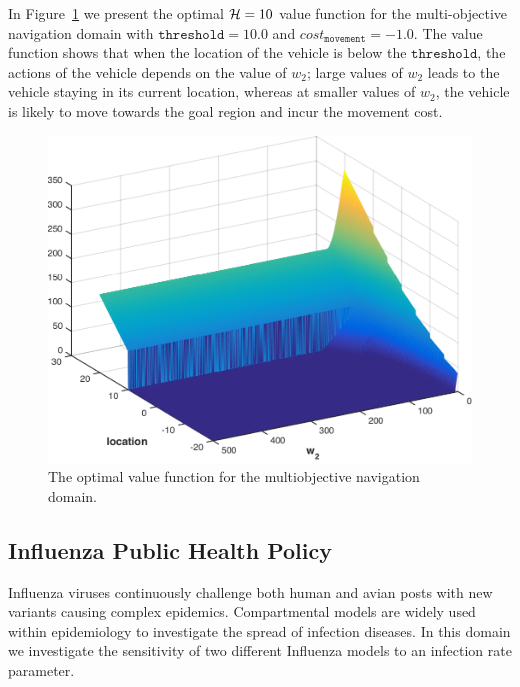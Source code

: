 In Figure~\ref{fig:vehicle1d} we present the optimal {\footnotesize$ \mathcal{H} = 10 $} value function for the multi-objective navigation domain with {\footnotesize $ \mathtt{threshold} = 10.0 $} and {\footnotesize$ cost_{\mathtt{movement}} = -1.0 $}. The value function shows that when the location of the vehicle is below the {\footnotesize $ \mathtt{threshold} $}, the actions of the vehicle depends on the value of {\footnotesize $ w_2 $}; large values of {\footnotesize $ w_2 $} leads to the vehicle staying in its current location, whereas at smaller values of {\footnotesize $ w_2 $}, the vehicle is likely to move towards the goal region and incur the movement cost.
\begin{figure}[h!]
    \centering
    \includegraphics[width=0.8\linewidth, height=0.6\linewidth]{images/robot1d}
    \caption{The optimal value function for the multiobjective navigation domain.}
    \label{fig:vehicle1d}            
\end{figure}

\subsection{Influenza Public Health Policy}
\label{sec:results_influenza}

Influenza viruses continuously challenge both human and avian posts with new variants causing complex epidemics. Compartmental models are widely used within epidemiology to investigate the spread of infection diseases. In this domain we investigate the sensitivity of two different Influenza models to an infection rate parameter. 

